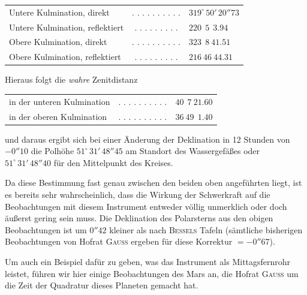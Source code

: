 \begin{center}
\begin{tabular}{l c l}
Untere Kulmination, direkt & . . . . . . . . . . & $319^\circ\,50'\,20''\!73$ \\
Untere Kulmination, reflektiert & . . . . . . . . . & $220\ \ 5\ \ 3.94$ \\
Obere Kulmination, direkt & . . . . . . . . . . & $323\ \ 8\ 41.51$ \\
Obere Kulmination, reflektiert & . . . . . . . . . & $216\ 46\ 44.31$ \\
\end{tabular}
\end{center}

\begin{center}
Hieraus folgt die \textit{wahre} Zenitdistanz
\end{center}

\begin{center}
\begin{tabular}{l c l}
in der unteren Kulmination & . . . . . . . . . . & $40\ \ 7\ 21.60$ \\
in der oberen Kulmination & . . . . . . . . . . & $36\ 49\ \ 1.40$ \\
\end{tabular}
\end{center}

\noindent und daraus ergibt sich bei einer Änderung der Deklination in 12 Stunden von $-0''10$ die Polhöhe $51^\circ\,31'\,48''\!45$ am Standort des Wassergefäßes oder $51^\circ\,31'\,48''\!40$ für den Mittelpunkt des Kreises.

\par\indent Da diese Bestimmung fast genau zwischen den beiden oben angeführten liegt, ist es bereits sehr wahrscheinlich, dass die Wirkung der Schwerkraft auf die Beobachtungen mit diesem Instrument entweder völlig unmerklich oder doch äußerst gering sein muss. Die Deklination des Polarsterns aus den obigen Beobachtungen ist um $0''42$ kleiner als nach \textsc{Bessels} Tafeln (sämtliche bisherigen Beobachtungen von Hofrat \textsc{Gauss} ergeben für diese Korrektur $=
-0''67$).

Um auch ein Beispiel dafür zu geben, was das Instrument als Mittagsfernrohr leistet, führen wir hier einige Beobachtungen des Mars an, die Hofrat \textsc{Gauss} um die Zeit der Quadratur dieses Planeten gemacht hat.

